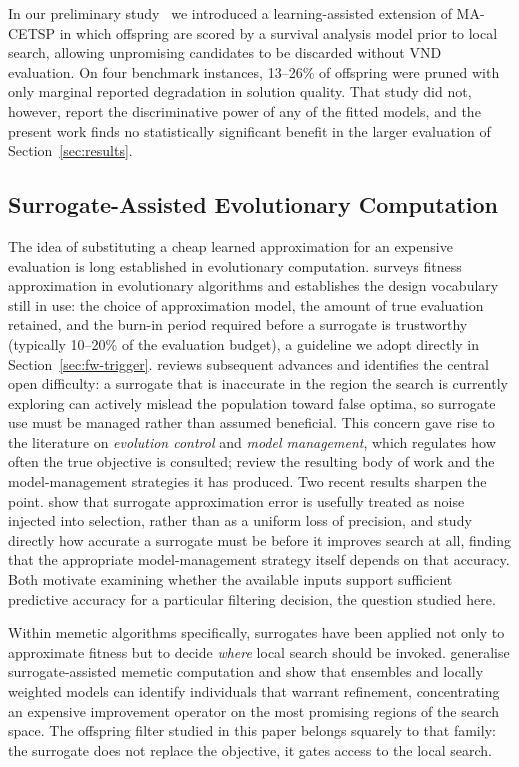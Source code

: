 \documentclass[a4paper,fleqn]{cas-dc}
\begin{document}
In our preliminary
study~\citep{balemir2026lacetsp} we introduced a learning-assisted extension of
MA-CETSP in which offspring are scored by a survival analysis model prior to
local search, allowing unpromising candidates to be discarded without VND
evaluation. On four benchmark instances, 13--26\% of offspring were pruned with
only marginal reported degradation in solution quality. That study did not,
however, report the discriminative power of any of the fitted models, and the
present work finds no statistically significant benefit in the larger evaluation
of Section~\ref{sec:results}.

\subsection{Surrogate-Assisted Evolutionary Computation}\label{sec:rel-surrogate}

The idea of substituting a cheap learned approximation for an expensive
evaluation is long established in evolutionary computation.
\citet{jin2005comprehensive} surveys fitness approximation in evolutionary
algorithms and establishes the design vocabulary still in use: the choice of
approximation model, the amount of true evaluation retained, and the burn-in
period required before a surrogate is trustworthy (typically 10--20\% of the
evaluation budget), a guideline we adopt directly in
Section~\ref{sec:fw-trigger}. \citet{jin2011surrogate} reviews subsequent
advances and identifies the central open difficulty: a surrogate that is
inaccurate in the region the search is currently exploring can actively mislead
the population toward false optima, so surrogate use must be managed rather than
assumed beneficial. This concern gave rise to the literature on
\emph{evolution control} and \emph{model management}, which regulates how often
the true objective is consulted; \citet{he2023review} review the resulting body
of work and the model-management strategies it has produced. Two recent results
sharpen the point. \citet{zheng2024noise} show that surrogate approximation
error is usefully treated as noise injected into selection, rather than as a
uniform loss of precision, and \citet{hanawa2025impact} study directly how
accurate a surrogate must be before it improves search at all, finding that the
appropriate model-management strategy itself depends on that accuracy. Both
motivate examining whether the available inputs support sufficient predictive
accuracy for a particular filtering decision, the question studied here.

Within memetic algorithms specifically, surrogates have been applied not only to
approximate fitness but to decide \emph{where} local search should be invoked.
\citet{lim2010generalizing} generalise surrogate-assisted memetic computation
and show that ensembles and locally weighted models can identify individuals
that warrant refinement, concentrating an expensive improvement operator on the
most promising regions of the search space. The offspring filter studied in this
paper belongs squarely to that family: the surrogate does not replace the
objective, it gates access to the local search.
\end{document}
